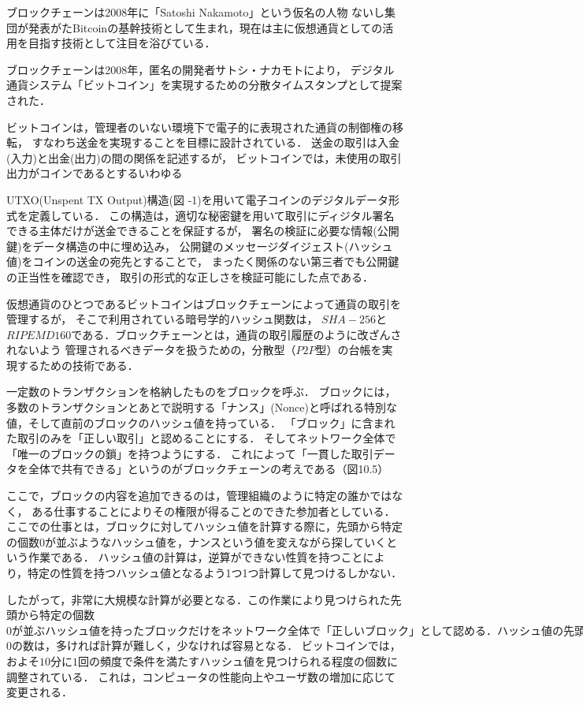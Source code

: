 \documentclass[a4paper,12pt]{jsarticle}
\begin{document}
ブロックチェーンは2008年に「Satoshi Nakamoto」という仮名の人物
ないし集団が発表がたBitcoinの基幹技術として生まれ，現在は主に仮想通貨としての活用を目指す技術として注目を浴びている．

ブロックチェーンは2008年，匿名の開発者サトシ・ナカモトにより，
デジタル通貨システム「ビットコイン」を実現するための分散タイムスタンプとして提案された．

ビットコインは，管理者のいない環境下で電子的に表現された通貨の制御権の移転，
すなわち送金を実現することを目標に設計されている．
送金の取引は入金(入力)と出金(出力)の間の関係を記述するが，
ビットコインでは，未使用の取引出力がコインであるとするいわゆる

UTXO(Unspent TX Output)構造(図 -1)を用いて電子コインのデジタルデータ形式を定義している．
この構造は，適切な秘密鍵を用いて取引にディジタル署名できる主体だけが送金できることを保証するが，
署名の検証に必要な情報(公開鍵)をデータ構造の中に埋め込み，
公開鍵のメッセージダイジェスト(ハッシュ値)をコインの送金の宛先とすることで，
まったく関係のない第三者でも公開鍵の正当性を確認でき，
取引の形式的な正しさを検証可能にした点である．

仮想通貨のひとつであるビットコインはブロックチェーンによって通貨の取引を管理するが，
そこで利用されている暗号学的ハッシュ関数は，
$SHA-256$と$RIPEMD160$である．ブロックチェーンとは，通貨の取引履歴のように改ざんされないよう
管理されるべきデータを扱うための，分散型（$P2P$型）の台帳を実現するための技術である．

一定数のトランザクションを格納したものをブロックを呼ぶ．
ブロックには，多数のトランザクションとあとで説明する「ナンス」(Nonce)と呼ばれる特別な値，そして直前のブロックのハッシュ値を持っている．
「ブロック」に含まれた取引のみを「正しい取引」と認めることにする．
そしてネットワーク全体で「唯一のブロックの鎖」を持つようにする．
これによって「一貫した取引データを全体で共有できる」というのがブロックチェーンの考えである（図10.5）


ここで，ブロックの内容を追加できるのは，管理組織のように特定の誰かではなく，
ある仕事することによりその権限が得ることのできた参加者としている．
ここでの仕事とは，ブロックに対してハッシュ値を計算する際に，先頭から特定の個数$0$が並ぶようなハッシュ値を，ナンスという値を変えながら探していくという作業である．
ハッシュ値の計算は，逆算ができない性質を持つことにより，特定の性質を持つハッシュ値となるよう1つ1つ計算して見つけるしかない．

したがって，非常に大規模な計算が必要となる．この作業により見つけられた先頭から特定の個数$0が並ぶハッシュ値を持ったブロックだけをネットワーク全体で「正しいブロック」として認める．
ハッシュ値の先頭から並ぶ$0の数は，多ければ計算が難しく，少なければ容易となる．
ビットコインでは，およそ$10$分に$1$回の頻度で条件を満たすハッシュ値を見つけられる程度の個数に調整されている．
これは，コンピュータの性能向上やユーザ数の増加に応じて変更される．
\end{document}
